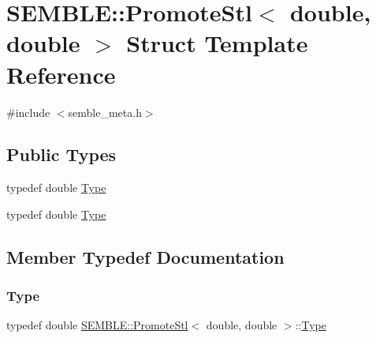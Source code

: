 \hypertarget{structSEMBLE_1_1PromoteStl_3_01double_00_01double_01_4}{}\section{S\+E\+M\+B\+LE\+:\+:Promote\+Stl$<$ double, double $>$ Struct Template Reference}
\label{structSEMBLE_1_1PromoteStl_3_01double_00_01double_01_4}


{\ttfamily \#include $<$semble\+\_\+meta.\+h$>$}

\subsection*{Public Types}
\begin{DoxyCompactItemize}
\item 
typedef double \mbox{\hyperlink{structSEMBLE_1_1PromoteStl_3_01double_00_01double_01_4_a09037ec720a5c55429c0ef2db9468631}{Type}}
\item 
typedef double \mbox{\hyperlink{structSEMBLE_1_1PromoteStl_3_01double_00_01double_01_4_a09037ec720a5c55429c0ef2db9468631}{Type}}
\end{DoxyCompactItemize}


\subsection{Member Typedef Documentation}
\mbox{\label{structSEMBLE_1_1PromoteStl_3_01double_00_01double_01_4_a09037ec720a5c55429c0ef2db9468631}} 
\subsubsection{\texorpdfstring{Type}{Type}\hspace{0.1cm}{\footnotesize\ttfamily [1/2]}}
{\footnotesize\ttfamily typedef double \mbox{\hyperlink{structSEMBLE_1_1PromoteStl}{S\+E\+M\+B\+L\+E\+::\+Promote\+Stl}}$<$ double, double $>$\+::\mbox{\hyperlink{structSEMBLE_1_1PromoteStl_3_01double_00_01double_01_4_a09037ec720a5c55429c0ef2db9468631}{Type}}}

\mbox{\label{structSEMBLE_1_1PromoteStl_3_01double_00_01double_01_4_a09037ec720a5c55429c0ef2db9468631}} 
